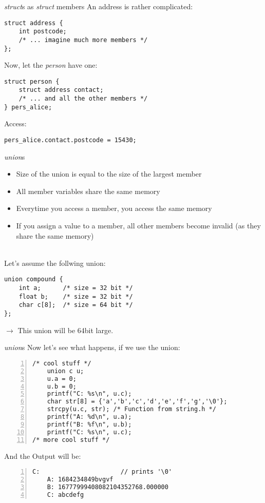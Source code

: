 
\begin{frame}[fragile]{\textit{struct}s as \textit{struct} members}
	An address is rather complicated:
	\begin{lstlisting}[numbers=none]
struct address {
	int postcode;
	/* ... imagine much more members */
};
\end{lstlisting}
	Now, let the \textit{person} have one:
	\begin{lstlisting}[numbers=none]
struct person {
	struct address contact;
	/* ... and all the other members */
} pers_alice;
\end{lstlisting}
	Access:
\begin{lstlisting}[numbers=none]
pers_alice.contact.postcode = 15430;
\end{lstlisting}
\end{frame}


\begin{frame}[fragile]{\textit{union}s}
	\begin{itemize}
		\item Size of the union is equal to the size of the largest member
		\item All member variables share the same memory
		\item Everytime you access a member, you access the same memory
		\item If you assign a value to a member, all other members become invalid (as they share the same memory)
	\end{itemize} \ \\ 
	Let's assume the follwing union:
	\begin{lstlisting}[numbers=none]
union compound {
	int a;      /* size = 32 bit */
	float b;    /* size = 32 bit */
	char c[8];  /* size = 64 bit */
};
\end{lstlisting}
 $\rightarrow$ This union will be 64bit large.
\end{frame}

\begin{frame}[fragile]{\textit{union}s}
Now let's see what happens, if we use the union:
	\begin{lstlisting}[numbers=left]
/* cool stuff */
    union c u;
	u.a = 0;
	u.b = 0;
	printf("C: %s\n", u.c);	
	char str[8] = {'a','b','c','d','e','f','g','\0'}; 
	strcpy(u.c, str); /* Function from string.h */
	printf("A: %d\n", u.a);
	printf("B: %f\n", u.b);	
	printf("C: %s\n", u.c);	
/* more cool stuff */ \end{lstlisting}
And the Output will be:
	\begin{lstlisting}[numbers=left]
    C:                      // prints '\0'
	A: 1684234849bvgvf
    B: 16777999408082104352768.000000
    C: abcdefg\end{lstlisting}
\end{frame}

